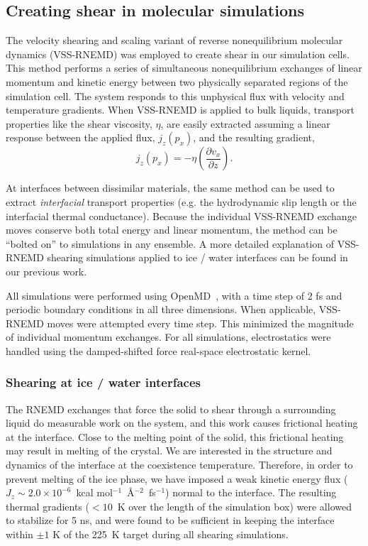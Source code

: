 \subsection{Creating shear in molecular simulations}
The velocity shearing and scaling variant of reverse nonequilibrium
molecular dynamics (VSS-RNEMD)\cite{Kuang2012} was employed to create
shear in our simulation cells. This method performs a series of
simultaneous nonequilibrium exchanges of linear momentum and kinetic
energy between two physically separated regions of the simulation
cell. The system responds to this unphysical flux with velocity and
temperature gradients. When VSS-RNEMD is applied to bulk liquids,
transport properties like the shear viscosity, $\eta$, are easily
extracted assuming a linear response between the applied flux,
$j_z(p_x)$, and the resulting gradient,
\begin{equation}
j_z(p_x) = -\eta \left(\frac{\partial v_x}{\partial z}\right).
\end{equation}

At interfaces between dissimilar materials, the same method can be
used to extract \textit{interfacial} transport properties (e.g. the
hydrodynamic slip length or the interfacial thermal
conductance). Because the individual VSS-RNEMD exchange moves conserve
both total energy and linear momentum, the method can be ``bolted on''
to simulations in any ensemble.  A more detailed explanation of
VSS-RNEMD shearing simulations applied to ice / water interfaces can
be found in our previous work.\cite{Louden2013}

All simulations were performed using
OpenMD~\cite{Meineke2005,Gezelter2016}, with a time step of 2 fs and
periodic boundary conditions in all three dimensions. When applicable,
VSS-RNEMD moves were attempted every time step. This minimized the
magnitude of individual momentum exchanges. For all simulations,
electrostatics were handled using the damped-shifted force real-space
electrostatic kernel.\cite{Fennell2006}

\subsubsection{Shearing at ice / water interfaces}
The RNEMD exchanges that force the solid to shear through a
surrounding liquid do measurable work on the system, and this work
causes frictional heating at the interface. Close to the melting point
of the solid, this frictional heating may result in melting of the
crystal.  We are interested in the structure and dynamics of the
interface at the coexistence temperature.  Therefore, in order to
prevent melting of the ice phase, we have imposed a weak kinetic
energy flux ($J_z \sim 2.0\times 10^{-6}$~kcal
mol$^{-1}$~\AA$^{-2}$~fs$^{-1}$) normal to the interface. The
resulting thermal gradients ($< 10$~K over the length of the
simulation box) were allowed to stabilize for 5 ns, and were found to
be sufficient in keeping the interface within $\pm 1$ K of the 225~K
target during all shearing simulations.
 
